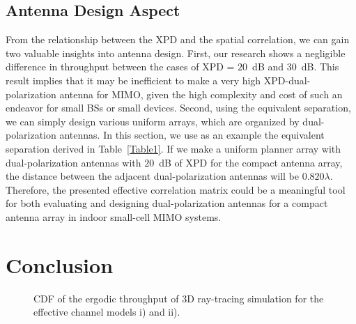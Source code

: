 \documentclass[journal]{IEEEtran}
\begin{document}
\subsection{Antenna Design Aspect}
From the relationship between the XPD and the spatial correlation, we can gain two valuable insights into antenna design. First, our research shows a negligible difference in throughput between the cases of XPD = $20$~dB and $30$~dB.
This result implies that it may be inefficient to make a very high XPD-dual-polarization antenna for MIMO, given the high complexity and cost of such an endeavor for small BSs or small devices.
Second, using the equivalent separation, we can simply design various uniform arrays, which are organized by dual-polarization antennas. In this section, we use as an example the equivalent separation derived in Table~\ref{Table1}. If we make a uniform planner array with dual-polarization antennas with $20$~dB of XPD for the compact antenna array, the distance between the adjacent dual-polarization antennas will be $0.820 \lambda$.
Therefore, the presented effective correlation matrix could be a meaningful tool for both evaluating and designing dual-polarization antennas for a compact antenna array in indoor small-cell MIMO systems.

\section{Conclusion}
\begin{figure}[!t]
\caption{CDF of the ergodic throughput of 3D ray-tracing simulation for the effective channel models i) and ii).}
\label{result}
\end{figure}

\renewcommand{\arraystretch}{1.3}
\begin{table}[!t]
	\caption{Equivalent spatial separation between adjacent antennas compared with XPD}
	\vspace{-0.6cm}
	\begin{center}
	\end{center}{\label{Table1}}
\vspace{-0.4cm}
\end{table}
\end{document}
